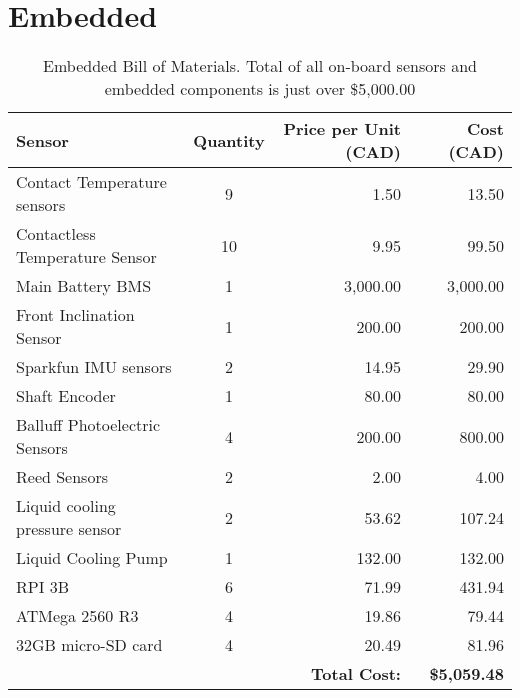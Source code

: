\documentclass[main.tex]{subfiles}
\begin{document}
\section{Embedded}
\begin{table}[H]
  	  \centering
      \begin{tabular}{@{}lcrr@{}} \toprule
        Sensor & Quantity & Price per Unit (CAD) & Cost (CAD) \\ \midrule
        Contact Temperature sensors & 9 & 1.50 & 13.50 \\
        Contactless Temperature Sensor & 10 & 9.95 & 99.50 \\
        Main Battery BMS & 1 & 3,000.00 & 3,000.00 \\
        Front Inclination Sensor & 1 & 200.00 & 200.00 \\
        Sparkfun IMU sensors & 2 & 14.95 & 29.90 \\
        Shaft Encoder & 1 & 80.00 & 80.00 \\
        Balluff Photoelectric Sensors & 4 & 200.00 & 800.00 \\
        Reed Sensors & 2 & 2.00 & 4.00 \\
        Liquid cooling pressure sensor & 2 & 53.62 & 107.24 \\
        Liquid Cooling Pump & 1 & 132.00 & 132.00 \\
        RPI 3B & 6 & 71.99 & 431.94 \\
        ATMega 2560 R3 & 4 & 19.86 & 79.44 \\
        32GB micro-SD card & 4 & 20.49 & 81.96 \\ \midrule
        &  &  \textbf{Total Cost:} & \textbf{\$5,059.48} \\ \bottomrule
      \end{tabular}
      \caption{Embedded Bill of Materials. Total of all on-board sensors and embedded components is just over \$5,000.00}
      \label{tab:emb-bom}
\end{table}
\end{document}
